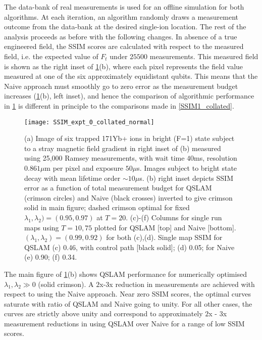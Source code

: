 \documentclass[reprint,longbibliography]{revtex4-1} %
\begin{document}
The data-bank of real measurements is used for an offline simulation for both algorithms. At each iteration, an algorithm randomly draws a measurement outcome from the data-bank at the desired single-ion location.  The rest of the analysis proceeds as before with the following changes. In absence of a true engineered field, the SSIM scores are calculated with respect to the measured field, i.e. the expected value of $F_t$ under $25500$ measurements. This measured field is shown as the right inset of \cref{SSIM_expt_0_collated_normal}(b), where each pixel represents the field value measured at one of the six approximately equidistant qubits. This means that the Naive approach must smoothly go to zero error as the measurement budget increases (\cref{SSIM_expt_0_collated_normal}(b), left inset), and hence the comparison of algorithmic performance in  \cref{SSIM_expt_0_collated_normal} is  different in principle to the comparisons made in \cref{SSIM1_collated}.
\begin{figure}
	\texttt{[image: SSIM\_expt\_0\_collated\_normal]}
	\caption{\label{SSIM_expt_0_collated_normal} (a) Image of six trapped 171Yb+ ions in bright (F=1) state subject to a stray magnetic field gradient in right inset of (b) measured using 25,000 Ramsey measurements, with wait time $40$ms, resolution $0.861 \mu$m per pixel and exposure $50 \mu$s. Images subject to bright state decay with mean lifetime order $\sim 10\mu$s. (b) right inset depicts SSIM error as a function of total measurement budget for QSLAM (crimson circles) and Naive (black crosses) inverted to give crimson solid in main figure; dashed crimson optimal for fixed  $\lambda_1, \lambda_2) = (0.95, 0.97) $ at $T=20$. (c)-(f) Columns for single run maps using $T=10, 75$ plotted for QSLAM [top] and Naive [bottom]. $(\lambda_1, \lambda_2)= (0.99, 0.92)$ for both (c),(d). Single map SSIM for QSLAM (c) 0.46, with control path [black solid]; (d) 0.05; for Naive (e) 0.90; (f) 0.34.}    	
\end{figure}

The main figure of \cref{SSIM_expt_0_collated_normal}(b) shows QSLAM performance for numerically optimised $\lambda_1, \lambda_2 \gg 0$ (solid crimson). A $2$x-$3$x reduction in measurements are achieved with respect to using the Naive approach. Near zero SSIM scores, the optimal curves saturate with ratio of QSLAM and Naive going to unity. For all other cases, the curves are strictly above unity and correspond to approximately $2$x - $3$x measurement reductions in using QSLAM over Naive for a range of low SSIM scores. 
\end{document}
